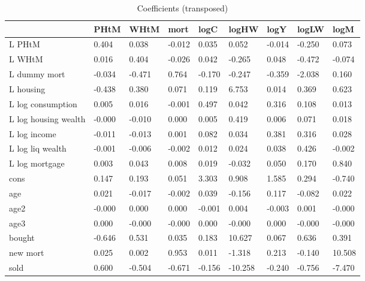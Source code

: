 \begin{table}[htbp]
\caption{\label{clabel} Coefficients (transposed)}\centering\medskip
\begin{tabular}{lllllllll} \hline \hline
 & PHtM  & WHtM  & mort  & logC  & logHW  & logY  & logLW  & logM  \\  \hline 
L PHtM &     0.404 &     0.038 &    -0.012 &     0.035 &     0.052 &    -0.014 &    -0.250 &     0.073 \\  
L WHtM &     0.016 &     0.404 &    -0.026 &     0.042 &    -0.265 &     0.048 &    -0.472 &    -0.074 \\  
L dummy mort &    -0.034 &    -0.471 &     0.764 &    -0.170 &    -0.247 &    -0.359 &    -2.038 &     0.160 \\  
L housing &    -0.438 &     0.380 &     0.071 &     0.119 &     6.753 &     0.014 &     0.369 &     0.623 \\  
L log consumption &     0.005 &     0.016 &    -0.001 &     0.497 &     0.042 &     0.316 &     0.108 &     0.013 \\  
L log housing wealth &    -0.000 &    -0.010 &     0.000 &     0.005 &     0.419 &     0.006 &     0.071 &     0.018 \\  
L log income &    -0.011 &    -0.013 &     0.001 &     0.082 &     0.034 &     0.381 &     0.316 &     0.028 \\  
L log liq wealth &    -0.001 &    -0.006 &    -0.002 &     0.012 &     0.024 &     0.038 &     0.426 &    -0.002 \\  
L log mortgage &     0.003 &     0.043 &     0.008 &     0.019 &    -0.032 &     0.050 &     0.170 &     0.840 \\  
cons &     0.147 &     0.193 &     0.051 &     3.303 &     0.908 &     1.585 &     0.294 &    -0.740 \\  
age &     0.021 &    -0.017 &    -0.002 &     0.039 &    -0.156 &     0.117 &    -0.082 &     0.022 \\  
age2 &    -0.000 &     0.000 &     0.000 &    -0.001 &     0.004 &    -0.003 &     0.001 &    -0.000 \\  
age3 &     0.000 &    -0.000 &    -0.000 &     0.000 &    -0.000 &     0.000 &    -0.000 &    -0.000 \\  
bought &    -0.646 &     0.531 &     0.035 &     0.183 &    10.627 &     0.067 &     0.636 &     0.391 \\  
new mort &     0.025 &     0.002 &     0.953 &     0.011 &    -1.318 &     0.213 &    -0.140 &    10.508 \\  
sold &     0.600 &    -0.504 &    -0.671 &    -0.156 &   -10.258 &    -0.240 &    -0.756 &    -7.470 \\  
\hline \hline \end{tabular}
\end{table}
